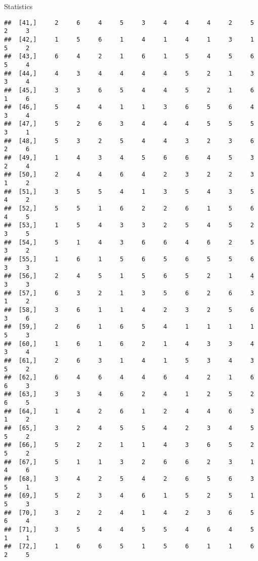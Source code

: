 \documentclass[
  ignorenonframetext,
]{beamer}
\begin{document}
\begin{frame}[fragile]{Statistics}
\begin{verbatim}
##  [41,]     2     6     4     5     3     4     4     4     2     5     2     3
##  [42,]     1     5     6     1     4     1     4     1     3     1     5     2
##  [43,]     6     4     2     1     6     1     5     4     5     6     5     4
##  [44,]     4     3     4     4     4     4     5     2     1     3     3     4
##  [45,]     3     3     6     5     4     4     5     2     1     6     1     6
##  [46,]     5     4     4     1     1     3     6     5     6     4     3     4
##  [47,]     5     2     6     3     4     4     4     5     5     5     3     1
##  [48,]     5     3     2     5     4     4     3     2     3     6     2     6
##  [49,]     1     4     3     4     5     6     6     4     5     3     2     4
##  [50,]     2     4     4     6     4     2     3     2     2     3     1     2
##  [51,]     3     5     5     4     1     3     5     4     3     5     4     2
##  [52,]     5     5     1     6     2     2     6     1     5     6     4     5
##  [53,]     1     5     4     3     3     2     5     4     5     2     3     5
##  [54,]     5     1     4     3     6     6     4     6     2     5     3     2
##  [55,]     1     6     1     5     6     5     6     5     5     6     3     3
##  [56,]     2     4     5     1     5     6     5     2     1     4     3     3
##  [57,]     6     3     2     1     3     5     6     2     6     3     1     2
##  [58,]     3     6     1     1     4     2     3     2     5     6     3     6
##  [59,]     2     6     1     6     5     4     1     1     1     1     5     3
##  [60,]     1     6     1     6     2     1     4     3     3     4     3     4
##  [61,]     2     6     3     1     4     1     5     3     4     3     5     2
##  [62,]     6     4     6     4     4     6     4     2     1     6     6     3
##  [63,]     3     3     4     6     2     4     1     2     5     2     6     5
##  [64,]     1     4     2     6     1     2     4     4     6     3     1     2
##  [65,]     3     2     4     5     5     4     2     3     4     5     5     2
##  [66,]     5     2     2     1     1     4     3     6     5     2     5     2
##  [67,]     5     1     1     3     2     6     6     2     3     1     4     6
##  [68,]     3     4     2     5     4     2     6     5     6     3     5     1
##  [69,]     5     2     3     4     6     1     5     2     5     1     5     3
##  [70,]     3     2     2     4     1     4     2     3     6     5     6     4
##  [71,]     3     5     4     4     5     5     4     6     4     5     1     1
##  [72,]     1     6     6     5     1     5     6     1     1     6     2     5

\end{verbatim}
\end{frame}
\end{document}
